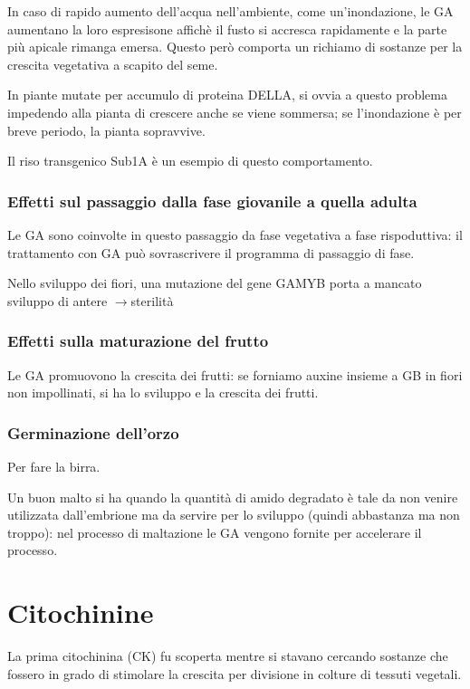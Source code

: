 \documentclass[a4paper,12pt]{book}
\newcommand{\lfreccia}{\ensuremath{\longrightarrow}}
\begin{document}
In caso di rapido aumento dell'acqua nell'ambiente, come un'inondazione,  le GA aumentano la loro espresisone affichè il fusto si accresca rapidamente e la parte più apicale rimanga emersa. Questo però comporta un richiamo di sostanze per la crescita vegetativa a scapito del seme.

In piante mutate per accumulo di proteina DELLA, si ovvia a questo problema impedendo alla pianta di crescere anche se viene sommersa; se l'inondazione è per breve periodo, la pianta sopravvive.

Il riso transgenico Sub1A è un esempio di questo comportamento.

\subsection{Effetti sul passaggio dalla fase giovanile a quella adulta}
Le GA sono coinvolte in questo passaggio da fase vegetativa a fase rispoduttiva: il trattamento con GA può sovrascrivere il programma di passaggio di fase.

Nello sviluppo dei fiori, una mutazione del gene GAMYB porta a mancato sviluppo di antere \lfreccia sterilità

\subsection{Effetti sulla maturazione del frutto}
Le GA promuovono la crescita dei frutti: se forniamo auxine insieme a GB in fiori non impollinati, si ha lo sviluppo e la crescita dei frutti.

\subsection{Germinazione dell'orzo}
Per fare la birra.

Un buon malto si ha quando la quantità di amido degradato è tale da non venire utilizzata dall'embrione ma da servire per lo sviluppo (quindi abbastanza ma non troppo): nel processo di maltazione le GA vengono fornite per accelerare il processo.

\chapter{Citochinine}
La prima citochinina (CK) fu scoperta mentre
si stavano cercando sostanze che fossero in
grado di stimolare la crescita per divisione in
colture di tessuti vegetali.
\end{document}
